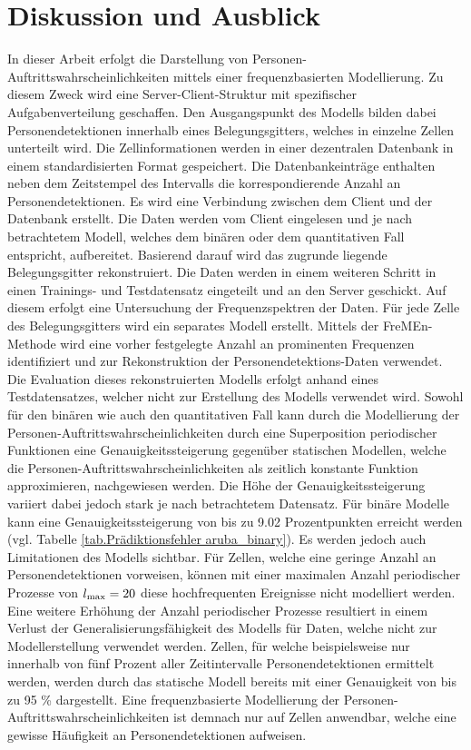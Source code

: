 \chapter{Diskussion und Ausblick}
\label{sec.diskussion_und_ausblick}
In dieser Arbeit erfolgt die Darstellung von Personen-Auftrittswahrscheinlichkeiten mittels einer frequenzbasierten Modellierung. Zu diesem Zweck wird eine Server-Client-Struktur mit spezifischer Aufgabenverteilung geschaffen. Den Ausgangspunkt des Modells bilden dabei Personendetektionen innerhalb eines Belegungsgitters, welches in einzelne Zellen unterteilt wird. Die Zellinformationen werden in einer dezentralen Datenbank in einem standardisierten Format gespeichert. Die Datenbankeinträge enthalten neben dem Zeitstempel des Intervalls die korrespondierende Anzahl an Personendetektionen. Es wird eine Verbindung zwischen dem Client und der Datenbank erstellt. Die Daten werden vom Client eingelesen und je nach betrachtetem Modell, welches dem binären oder dem quantitativen Fall entspricht, aufbereitet. Basierend darauf wird das zugrunde liegende Belegungsgitter rekonstruiert. Die Daten werden in einem weiteren Schritt in einen Trainings- und Testdatensatz eingeteilt und an den Server geschickt. Auf diesem erfolgt eine Untersuchung der Frequenzspektren der Daten. Für jede Zelle des Belegungsgitters wird ein separates Modell erstellt. Mittels der FreMEn-Methode wird eine vorher festgelegte Anzahl an prominenten Frequenzen identifiziert und zur Rekonstruktion der Personendetektions-Daten verwendet. Die Evaluation dieses rekonstruierten Modells erfolgt anhand eines Testdatensatzes, welcher nicht zur Erstellung des Modells verwendet wird. Sowohl für den binären wie auch den quantitativen Fall kann durch die Modellierung der Personen-Auftrittswahrscheinlichkeiten durch eine Superposition periodischer Funktionen eine Genauigkeitssteigerung gegenüber statischen Modellen, welche die Personen-Auftrittswahrscheinlichkeiten als zeitlich konstante Funktion approximieren, nachgewiesen werden. Die Höhe der Genauigkeitssteigerung variiert dabei jedoch stark je nach betrachtetem Datensatz. Für binäre Modelle kann eine Genauigkeitssteigerung von bis zu 9.02 Prozentpunkten erreicht werden (vgl. Tabelle \ref{tab.Prädiktionsfehler aruba_binary}). Es werden jedoch auch Limitationen des Modells sichtbar. Für Zellen, welche eine geringe Anzahl an Personendetektionen vorweisen, können mit einer maximalen Anzahl periodischer Prozesse von $l_{\mathrm{max}} = 20$ diese hochfrequenten Ereignisse nicht modelliert werden. Eine weitere Erhöhung der Anzahl periodischer Prozesse resultiert in einem Verlust der Generalisierungsfähigkeit des Modells für Daten, welche nicht zur Modellerstellung verwendet werden. Zellen, für welche beispielsweise nur innerhalb von fünf Prozent aller Zeitintervalle Personendetektionen ermittelt werden, werden durch das statische Modell bereits mit einer Genauigkeit von bis zu 95 \% dargestellt. Eine frequenzbasierte Modellierung der Personen-Auftrittswahrscheinlichkeiten ist demnach nur auf Zellen anwendbar, welche eine gewisse Häufigkeit an Personendetektionen aufweisen. \\
